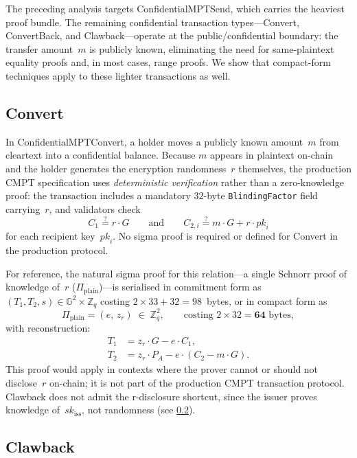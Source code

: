 \documentclass[11pt]{article}
\theoremstyle{definition}
\newcommand{\G}{\mathbb{G}}
\newcommand{\Zq}{\mathbb{Z}_q}
\newcommand{\sk}{\mathit{sk}}
\begin{document}
The preceding analysis targets \textsf{ConfidentialMPTSend}, which
carries the heaviest proof bundle.
The remaining confidential transaction types---\textsf{Convert},
\textsf{ConvertBack}, and \textsf{Clawback}---operate at the
public/confidential boundary: the transfer amount~$m$ is publicly
known, eliminating the need for same-plaintext equality proofs and,
in most cases, range proofs.
We show that compact-form techniques apply to these lighter
transactions as well.

\subsection{Convert}
\label{sec:convert}

In \textsf{ConfidentialMPTConvert}, a holder moves a publicly known
amount~$m$ from cleartext into a confidential balance.
Because $m$ appears in plaintext on-chain and the holder generates
the encryption randomness~$r$ themselves, the production CMPT
specification uses \emph{deterministic verification} rather than a
zero-knowledge proof: the transaction includes a mandatory
$32$-byte \texttt{BlindingFactor} field carrying~$r$, and
validators check
\[
  C_1 \stackrel{?}{=} r \cdot G
  \qquad\text{and}\qquad
  C_{2,i} \stackrel{?}{=} m \cdot G + r \cdot \mathit{pk}_i
\]
for each recipient key~$\mathit{pk}_i$.
No sigma proof is required or defined for Convert in the
production protocol.

For reference, the natural sigma proof for this relation---a
single Schnorr proof of knowledge of~$r$
($\Pi_{\mathrm{plain}}$)---is serialised in commitment form as
$(T_1, T_2, s) \in \G^2 \times \Zq$ costing
$2 \times 33 + 32 = 98$~bytes, or in compact form as
\[
  \Pi_{\mathrm{plain}} = (e,\, z_r) \;\in\; \Zq^2,
  \qquad\text{costing } 2 \times 32 = \mathbf{64}\text{~bytes},
\]
with reconstruction:
\begin{align}
  T_1 &= z_r \cdot G - e \cdot C_1, \label{eq:recon-conv-t1} \\
  T_2 &= z_r \cdot P_A - e \cdot (C_2 - m \cdot G).
    \label{eq:recon-conv-t2}
\end{align}
This proof would apply in contexts where the prover cannot or
should not disclose~$r$ on-chain; it is not part of the
production CMPT transaction protocol.
Clawback does not admit the r-disclosure shortcut, since the
issuer proves knowledge of~$\sk_{\mathrm{iss}}$, not randomness
(see \cref{sec:clawback}).

\subsection{Clawback}
\label{sec:clawback}
\end{document}
